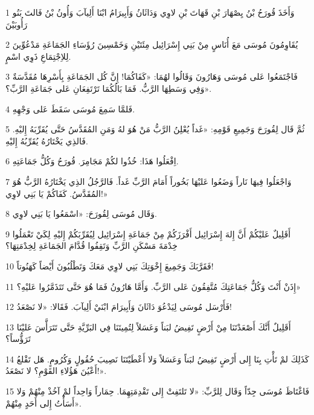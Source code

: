 \par 1 وَأَخَذَ قُورَحُ بْنُ يِصْهَارَ بْنِ قَهَاتَ بْنِ لاوِي وَدَاثَانُ وَأَبِيرَامُ ابْنَا أَلِيآبَ وَأُونُ بْنُ فَالتَ بَنُو رَأُوبَيْنَ
\par 2 يُقَاوِمُونَ مُوسَى مَعَ أُنَاسٍ مِنْ بَنِي إِسْرَائِيل مِئَتَيْنِ وَخَمْسِينَ رُؤَسَاءِ الجَمَاعَةِ مَدْعُوِّينَ لِلاِجْتِمَاعِ ذَوِي اسْمٍ.
\par 3 فَاجْتَمَعُوا عَلى مُوسَى وَهَارُونَ وَقَالُوا لهُمَا: «كَفَاكُمَا! إِنَّ كُل الجَمَاعَةِ بِأَسْرِهَا مُقَدَّسَةٌ وَفِي وَسَطِهَا الرَّبُّ. فَمَا بَالُكُمَا تَرْتَفِعَانِ عَلى جَمَاعَةِ الرَّبِّ؟».
\par 4 فَلمَّا سَمِعَ مُوسَى سَقَطَ عَلى وَجْهِهِ.
\par 5 ثُمَّ قَال لِقُورَحَ وَجَمِيعِ قَوْمِهِ: «غَداً يُعْلِنُ الرَّبُّ مَنْ هُوَ لهُ وَمَنِ المُقَدَّسُ حَتَّى يُقَرِّبَهُ إِليْهِ. فَالذِي يَخْتَارُهُ يُقَرِّبُهُ إِليْهِ.
\par 6 اِفْعَلُوا هَذَا: خُذُوا لكُمْ مَجَامِرَ. قُورَحُ وَكُلُّ جَمَاعَتِهِ.
\par 7 وَاجْعَلُوا فِيهَا نَاراً وَضَعُوا عَليْهَا بَخُوراً أَمَامَ الرَّبِّ غَداً. فَالرَّجُلُ الذِي يَخْتَارُهُ الرَّبُّ هُوَ المُقَدَّسُ. كَفَاكُمْ يَا بَنِي لاوِي!»
\par 8 وَقَال مُوسَى لِقُورَحَ: «اسْمَعُوا يَا بَنِي لاوِي.
\par 9 أَقَلِيلٌ عَليْكُمْ أَنَّ إِلهَ إِسْرَائِيل أَفْرَزَكُمْ مِنْ جَمَاعَةِ إِسْرَائِيل لِيُقَرِّبَكُمْ إِليْهِ لِكَيْ تَعْمَلُوا خِدْمَةَ مَسْكَنِ الرَّبِّ وَتَقِفُوا قُدَّامَ الجَمَاعَةِ لِخِدْمَتِهَا؟
\par 10 فَقَرَّبَكَ وَجَمِيعَ إِخْوَتِكَ بَنِي لاوِي مَعَكَ وَتَطْلُبُونَ أَيْضاً كَهَنُوتاً!
\par 11 إِذَنْ أَنْتَ وَكُلُّ جَمَاعَتِكَ مُتَّفِقُونَ عَلى الرَّبِّ. وَأَمَّا هَارُونُ فَمَا هُوَ حَتَّى تَتَذَمَّرُوا عَليْهِ؟»
\par 12 فَأَرْسَل مُوسَى لِيَدْعُوَ دَاثَانَ وَأَبِيرَامَ ابْنَيْ أَلِيآبَ. فَقَالا: «لا نَصْعَدُ!
\par 13 أَقَلِيلٌ أَنَّكَ أَصْعَدْتَنَا مِنْ أَرْضٍ تَفِيضُ لبَناً وَعَسَلاً لِتُمِيتَنَا فِي البَرِّيَّةِ حَتَّى تَتَرَأَّسَ عَليْنَا تَرَؤُّساً؟
\par 14 كَذَلِكَ لمْ تَأْتِ بِنَا إِلى أَرْضٍ تَفِيضُ لبَناً وَعَسَلاً وَلا أَعْطَيْتَنَا نَصِيبَ حُقُولٍ وَكُرُومٍ. هَل تَقْلعُ أَعْيُنَ هَؤُلاءِ القَوْمِ؟ لا نَصْعَدُ!».
\par 15 فَاغْتَاظَ مُوسَى جِدّاً وَقَال لِلرَّبِّ: «لا تَلتَفِتْ إِلى تَقْدِمَتِهِمَا. حِمَاراً وَاحِداً لمْ آخُذْ مِنْهُمْ وَلا أَسَأْتُ إِلى أَحَدٍ مِنْهُمْ».
